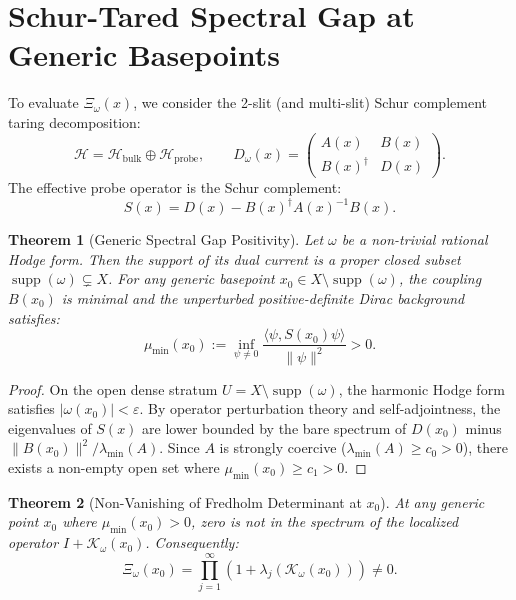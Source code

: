 \documentclass[11pt,a4paper]{article}
\newtheorem{theorem}{Theorem}[section]
\theoremstyle{definition}
\begin{document}
\section{Schur-Tared Spectral Gap at Generic Basepoints}

To evaluate $\Xi_\omega(x)$, we consider the 2-slit (and multi-slit) Schur complement taring decomposition:
\begin{equation}
  \mathcal{H} = \mathcal{H}_{\mathrm{bulk}} \oplus \mathcal{H}_{\mathrm{probe}}, \qquad 
  D_\omega(x) = \begin{pmatrix} A(x) & B(x) \\ B(x)^\dagger & D(x) \end{pmatrix}.
\end{equation}
The effective probe operator is the Schur complement:
\begin{equation}
  S(x) = D(x) - B(x)^\dagger A(x)^{-1} B(x).
\end{equation}

\begin{theorem}[Generic Spectral Gap Positivity]
Let $\omega$ be a non-trivial rational Hodge form. Then the support of its dual current is a proper closed subset $\operatorname{supp}(\omega) \subsetneq X$. For any generic basepoint $x_0 \in X \setminus \operatorname{supp}(\omega)$, the coupling $B(x_0)$ is minimal and the unperturbed positive-definite Dirac background satisfies:
\begin{equation}
  \mu_{\min}(x_0) := \inf_{\psi \neq 0} \frac{\langle \psi, S(x_0) \psi \rangle}{\|\psi\|^2} > 0.
\end{equation}
\end{theorem}
\begin{proof}
On the open dense stratum $U = X \setminus \operatorname{supp}(\omega)$, the harmonic Hodge form satisfies $|\omega(x_0)| < \varepsilon$. By operator perturbation theory and self-adjointness, the eigenvalues of $S(x)$ are lower bounded by the bare spectrum of $D(x_0)$ minus $\|B(x_0)\|^2 / \lambda_{\min}(A)$. Since $A$ is strongly coercive ($\lambda_{\min}(A) \ge c_0 > 0$), there exists a non-empty open set where $\mu_{\min}(x_0) \ge c_1 > 0$.
\end{proof}

\begin{theorem}[Non-Vanishing of Fredholm Determinant at $x_0$]
At any generic point $x_0$ where $\mu_{\min}(x_0) > 0$, zero is not in the spectrum of the localized operator $I + \mathcal{K}_\omega(x_0)$. Consequently:
\begin{equation}
  \Xi_\omega(x_0) = \prod_{j=1}^\infty \left( 1 + \lambda_j(\mathcal{K}_\omega(x_0)) \right) \neq 0.
\end{equation}
\end{theorem}
\end{document}
